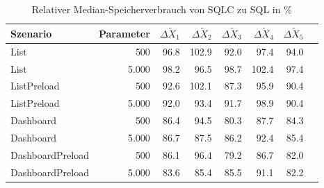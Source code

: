 
\begin{table}[ht]
\setlength{\extrarowheight}{-1pt}
\centering
\caption{Relativer Median-Speicherverbrauch von SQLC zu SQL in \%}
\begin{tabular}{lrrrrrrr}
\toprule
Szenario & Parameter & ${\Delta \tilde{X}_1}$ & ${\Delta \tilde{X}_2}$ & ${\Delta \tilde{X}_3}$ & ${\Delta \tilde{X}_4}$ & ${\Delta \tilde{X}_5}$ \\
\midrule
	List & 500 & \cellcolor{green!2}  96.8 & \cellcolor{red!1}  102.9 & \cellcolor{green!4}  92.0 & \cellcolor{green!1}  97.4 & \cellcolor{green!3}  94.0 \\
	List & 5.000 & \cellcolor{green!1}  98.2 & \cellcolor{green!2}  96.5 & \cellcolor{green!1}  98.7 & \cellcolor{red!1}  102.4 & \cellcolor{green!1}  97.4 \\
	ListPreload & 500 & \cellcolor{green!4}  92.6 & \cellcolor{red!1}  102.1 & \cellcolor{green!6}  87.3 & \cellcolor{green!2}  95.9 & \cellcolor{green!5}  90.4 \\
	ListPreload & 5.000 & \cellcolor{green!4}  92.0 & \cellcolor{green!3}  93.4 & \cellcolor{green!4}  91.7 & \cellcolor{green!1}  98.9 & \cellcolor{green!5}  90.4 \\
	Dashboard & 500 & \cellcolor{green!7}  86.4 & \cellcolor{green!3}  94.5 & \cellcolor{green!10}  80.3 & \cellcolor{green!6}  87.7 & \cellcolor{green!8}  84.3 \\
	Dashboard & 5.000 & \cellcolor{green!7}  86.7 & \cellcolor{green!6}  87.5 & \cellcolor{green!7}  86.2 & \cellcolor{green!4}  92.4 & \cellcolor{green!7}  85.4 \\
	DashboardPreload & 500 & \cellcolor{green!7}  86.1 & \cellcolor{green!2}  96.4 & \cellcolor{green!10}  79.2 & \cellcolor{green!7}  86.7 & \cellcolor{green!9}  82.0 \\
	DashboardPreload & 5.000 & \cellcolor{green!8}  83.6 & \cellcolor{green!7}  85.4 & \cellcolor{green!7}  85.5 & \cellcolor{green!4}  91.1 & \cellcolor{green!9}  82.2 \\
\bottomrule
\end{tabular}
\label{tab:relativer_speicherverbrauch_sqlc}
\end{table}
	